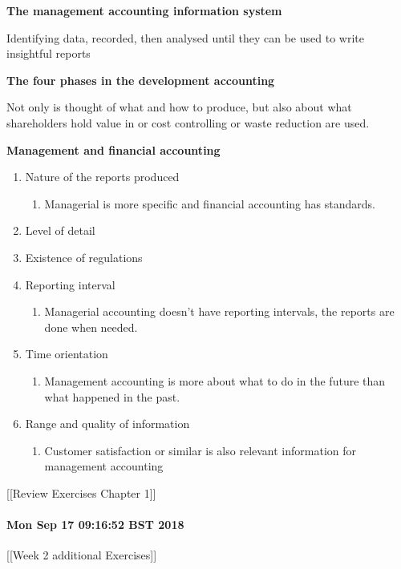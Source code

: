 \documentclass{article}
\begin{document}
\textbf{The management accounting information system}


Identifying data, recorded, then analysed until they can be used to write insightful reports

\textbf{The four phases in the development accounting}


Not only is thought of what and how to produce, but also about what shareholders hold value in or cost controlling or waste reduction are used.

\textbf{Management and financial accounting}

\begin{enumerate}
  \item Nature of the reports produced
    \begin{enumerate}
  \item Managerial is more specific and financial accounting has standards. 
    \end{enumerate}
  \item Level of detail
  \item Existence of regulations
  \item Reporting interval
    \begin{enumerate}
  \item Managerial accounting doesn't have reporting intervals, the reports are done when needed.
    \end{enumerate}
  \item Time orientation
    \begin{enumerate}
  \item Management accounting is more about what to do in the future than what happened in the past. 
    \end{enumerate}
  \item Range and quality of information
    \begin{enumerate}
  \item Customer satisfaction or similar is also relevant information for management accounting
    \end{enumerate}
\end{enumerate} 

[[Review Exercises Chapter 1]]

\clearpage

\paragraph{Mon Sep 17 09:16:52 BST 2018}

[[Week 2 additional Exercises]]
\end{document}
